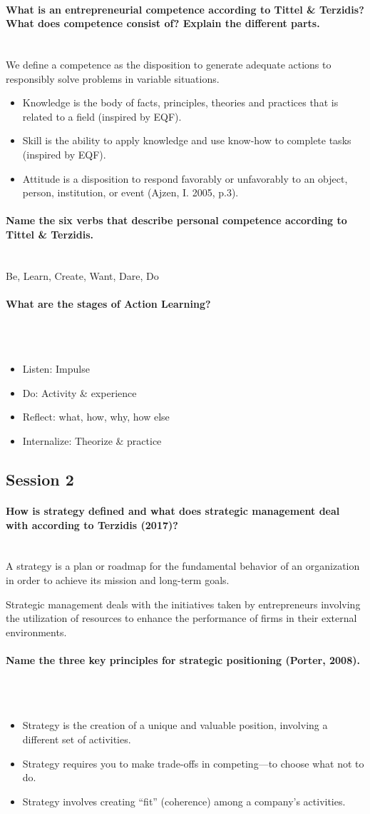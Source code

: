 \documentclass[10pt,a4paper,noendnumber=true]{scrartcl}
\newcommand{\properparagraph}[1]{\paragraph{\textcolor{Emerald}{#1}}\mbox{}\\}
\begin{document}
\properparagraph{What is an entrepreneurial competence according to Tittel \& Terzidis? What does competence consist of? Explain the different parts.}
We define a competence as the disposition to generate adequate actions to responsibly solve problems in variable situations.
\begin{itemize}
	\item Knowledge is the body of facts, principles, theories and 	practices that is related to a field (inspired by EQF).
	\item  Skill is the ability to apply knowledge and use know-how to complete tasks (inspired by EQF).
	\item  Attitude is a disposition to respond favorably or unfavorably to an object, person, institution, or event (Ajzen, I. 2005, p.3).
\end{itemize}

\properparagraph{Name the six verbs that describe personal competence according to Tittel \& Terzidis.}
Be, Learn, Create, Want, Dare, Do

\properparagraph{What are the stages of Action Learning?}
\\[-6ex]
\begin{itemize}
	\item Listen: Impulse
	\item Do: Activity \& experience
	\item Reflect: what, how, why, how else
	\item Internalize: Theorize \& practice
\end{itemize}









\newpage
\subsection{Session 2}
\properparagraph{How is strategy defined and what does strategic management deal with according to Terzidis (2017)?}
A strategy is a plan or roadmap for the fundamental behavior of an organization in order to achieve its mission and long-term goals.

Strategic management deals with the initiatives taken by entrepreneurs involving the utilization of resources to enhance the performance of firms in their external environments.

\properparagraph{Name the three key principles for strategic positioning (Porter, 2008).}
\\[-6ex]
\begin{itemize}
	\item Strategy is the creation of a unique and valuable position, involving a different set of activities.
	\item Strategy requires you to make	trade-offs in competing—to choose what not to do.
	\item Strategy involves creating “fit” (coherence) among a company’s activities.
\end{itemize}
\end{document}

